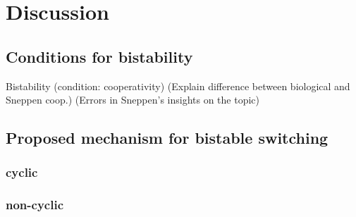 \chapter{Discussion}
    \label{cha:discussion}
    \section{Conditions for bistability}
        \begin{itemize}
            {
                \color{red}
                \item Bistability (condition: cooperativity) (Explain difference between biological and Sneppen coop.) (Errors in Sneppen's insights on the topic)
            }
        \end{itemize}
    \section{Proposed mechanism for bistable switching}
        \subsection{cyclic}

        \subsection{non-cyclic}

%
%
